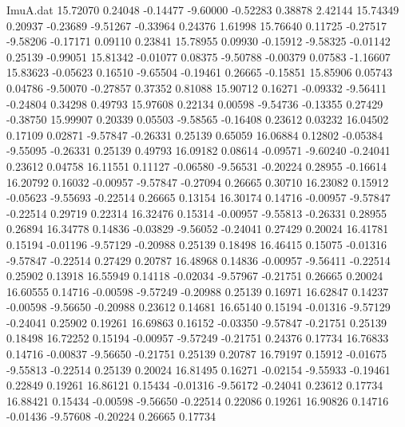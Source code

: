 \begin{filecontents}{ImuA.dat}
  15.72070    0.24048   -0.14477   -9.60000   -0.52283    0.38878    2.42144
  15.74349    0.20937   -0.23689   -9.51267   -0.33964    0.24376    1.61998
  15.76640    0.11725   -0.27517   -9.58206   -0.17171    0.09110    0.23841
  15.78955    0.09930   -0.15912   -9.58325   -0.01142    0.25139   -0.99051
  15.81342   -0.01077    0.08375   -9.50788   -0.00379    0.07583   -1.16607
  15.83623   -0.05623    0.16510   -9.65504   -0.19461    0.26665   -0.15851
  15.85906    0.05743    0.04786   -9.50070   -0.27857    0.37352    0.81088
  15.90712    0.16271   -0.09332   -9.56411   -0.24804    0.34298    0.49793
  15.97608    0.22134    0.00598   -9.54736   -0.13355    0.27429   -0.38750
  15.99907    0.20339    0.05503   -9.58565   -0.16408    0.23612    0.03232
  16.04502    0.17109    0.02871   -9.57847   -0.26331    0.25139    0.65059
  16.06884    0.12802   -0.05384   -9.55095   -0.26331    0.25139    0.49793
  16.09182    0.08614   -0.09571   -9.60240   -0.24041    0.23612    0.04758
  16.11551    0.11127   -0.06580   -9.56531   -0.20224    0.28955   -0.16614
  16.20792    0.16032   -0.00957   -9.57847   -0.27094    0.26665    0.30710
  16.23082    0.15912   -0.05623   -9.55693   -0.22514    0.26665    0.13154
  16.30174    0.14716   -0.00957   -9.57847   -0.22514    0.29719    0.22314
  16.32476    0.15314   -0.00957   -9.55813   -0.26331    0.28955    0.26894
  16.34778    0.14836   -0.03829   -9.56052   -0.24041    0.27429    0.20024
  16.41781    0.15194   -0.01196   -9.57129   -0.20988    0.25139    0.18498
  16.46415    0.15075   -0.01316   -9.57847   -0.22514    0.27429    0.20787
  16.48968    0.14836   -0.00957   -9.56411   -0.22514    0.25902    0.13918
  16.55949    0.14118   -0.02034   -9.57967   -0.21751    0.26665    0.20024
  16.60555    0.14716   -0.00598   -9.57249   -0.20988    0.25139    0.16971
  16.62847    0.14237   -0.00598   -9.56650   -0.20988    0.23612    0.14681
  16.65140    0.15194   -0.01316   -9.57129   -0.24041    0.25902    0.19261
  16.69863    0.16152   -0.03350   -9.57847   -0.21751    0.25139    0.18498
  16.72252    0.15194   -0.00957   -9.57249   -0.21751    0.24376    0.17734
  16.76833    0.14716   -0.00837   -9.56650   -0.21751    0.25139    0.20787
  16.79197    0.15912   -0.01675   -9.55813   -0.22514    0.25139    0.20024
  16.81495    0.16271   -0.02154   -9.55933   -0.19461    0.22849    0.19261
  16.86121    0.15434   -0.01316   -9.56172   -0.24041    0.23612    0.17734
  16.88421    0.15434   -0.00598   -9.56650   -0.22514    0.22086    0.19261
  16.90826    0.14716   -0.01436   -9.57608   -0.20224    0.26665    0.17734

\end{filecontents}
